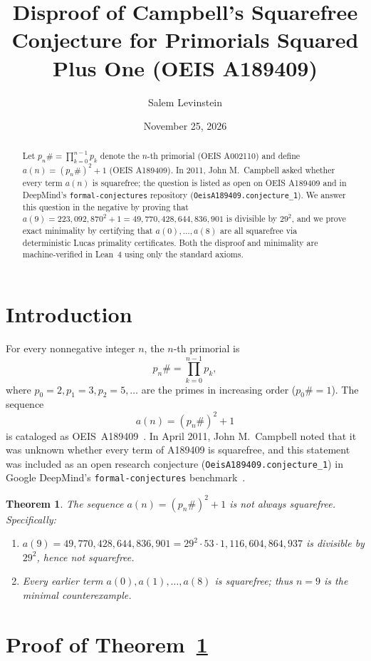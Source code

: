 \documentclass[11pt]{article}
\title{Disproof of Campbell's Squarefree Conjecture for Primorials Squared Plus One (OEIS A189409)}
\author{Salem Levinstein}
\date{November 25, 2026}
\newtheorem{theorem}{Theorem}
\begin{document}
\maketitle

\begin{abstract}
Let $p_n\# = \prod_{k=0}^{n-1} p_k$ denote the $n$-th primorial (OEIS A002110) and define $a(n) = (p_n\#)^2 + 1$ (OEIS A189409). In 2011, John M.\ Campbell asked whether every term $a(n)$ is squarefree; the question is listed as open on OEIS A189409 and in DeepMind's \texttt{formal-conjectures} repository (\texttt{OeisA189409.conjecture\_1}). We answer this question in the negative by proving that $a(9) = 223{,}092{,}870^2 + 1 = 49{,}770{,}428{,}644{,}836{,}901$ is divisible by $29^2$, and we prove exact minimality by certifying that $a(0), \dots, a(8)$ are all squarefree via deterministic Lucas primality certificates. Both the disproof and minimality are machine-verified in Lean~4 using only the standard axioms.
\end{abstract}

\section{Introduction}
For every nonnegative integer $n$, the $n$-th primorial is
\[
p_n\# = \prod_{k=0}^{n-1} p_k,
\]
where $p_0 = 2, p_1 = 3, p_2 = 5, \dots$ are the primes in increasing order ($p_0\# = 1$). The sequence
\[
a(n) = (p_n\#)^2 + 1
\]
is cataloged as OEIS~A189409~\cite{oeisA189409}. In April 2011, John M.\ Campbell noted that it was unknown whether every term of A189409 is squarefree, and this statement was included as an open research conjecture (\texttt{OeisA189409.conjecture\_1}) in Google DeepMind's \texttt{formal-conjectures} benchmark~\cite{formalconjectures}.

\begin{theorem}\label{thm:main}
The sequence $a(n) = (p_n\#)^2 + 1$ is not always squarefree. Specifically:
\begin{enumerate}
\item $a(9) = 49{,}770{,}428{,}644{,}836{,}901 = 29^2 \cdot 53 \cdot 1{,}116{,}604{,}864{,}937$ is divisible by $29^2$, hence not squarefree.
\item Every earlier term $a(0), a(1), \dots, a(8)$ is squarefree; thus $n = 9$ is the minimal counterexample.
\end{enumerate}
\end{theorem}

\section{Proof of Theorem~\ref{thm:main}}
\end{document}
